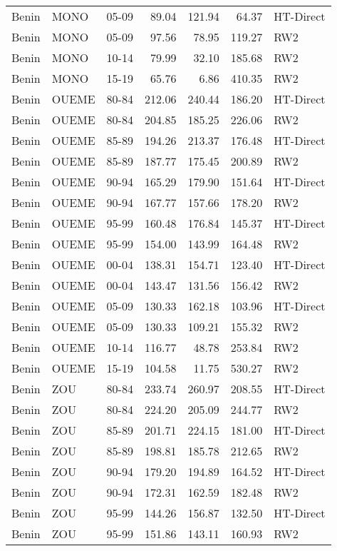 \begin{longtable}{lllrrrl}
  Benin & MONO & 05-09 & 89.04 & 121.94 & 64.37 & HT-Direct \\ 
  Benin & MONO & 05-09 & 97.56 & 78.95 & 119.27 & RW2 \\ 
  Benin & MONO & 10-14 & 79.99 & 32.10 & 185.68 & RW2 \\ 
  Benin & MONO & 15-19 & 65.76 & 6.86 & 410.35 & RW2 \\ 
  Benin & OUEME & 80-84 & 212.06 & 240.44 & 186.20 & HT-Direct \\ 
  Benin & OUEME & 80-84 & 204.85 & 185.25 & 226.06 & RW2 \\ 
  Benin & OUEME & 85-89 & 194.26 & 213.37 & 176.48 & HT-Direct \\ 
  Benin & OUEME & 85-89 & 187.77 & 175.45 & 200.89 & RW2 \\ 
  Benin & OUEME & 90-94 & 165.29 & 179.90 & 151.64 & HT-Direct \\ 
  Benin & OUEME & 90-94 & 167.77 & 157.66 & 178.20 & RW2 \\ 
  Benin & OUEME & 95-99 & 160.48 & 176.84 & 145.37 & HT-Direct \\ 
  Benin & OUEME & 95-99 & 154.00 & 143.99 & 164.48 & RW2 \\ 
  Benin & OUEME & 00-04 & 138.31 & 154.71 & 123.40 & HT-Direct \\ 
  Benin & OUEME & 00-04 & 143.47 & 131.56 & 156.42 & RW2 \\ 
  Benin & OUEME & 05-09 & 130.33 & 162.18 & 103.96 & HT-Direct \\ 
  Benin & OUEME & 05-09 & 130.33 & 109.21 & 155.32 & RW2 \\ 
  Benin & OUEME & 10-14 & 116.77 & 48.78 & 253.84 & RW2 \\ 
  Benin & OUEME & 15-19 & 104.58 & 11.75 & 530.27 & RW2 \\ 
  Benin & ZOU & 80-84 & 233.74 & 260.97 & 208.55 & HT-Direct \\ 
  Benin & ZOU & 80-84 & 224.20 & 205.09 & 244.77 & RW2 \\ 
  Benin & ZOU & 85-89 & 201.71 & 224.15 & 181.00 & HT-Direct \\ 
  Benin & ZOU & 85-89 & 198.81 & 185.78 & 212.65 & RW2 \\ 
  Benin & ZOU & 90-94 & 179.20 & 194.89 & 164.52 & HT-Direct \\ 
  Benin & ZOU & 90-94 & 172.31 & 162.59 & 182.48 & RW2 \\ 
  Benin & ZOU & 95-99 & 144.26 & 156.87 & 132.50 & HT-Direct \\ 
  Benin & ZOU & 95-99 & 151.86 & 143.11 & 160.93 & RW2 \\ 

\end{longtable}
